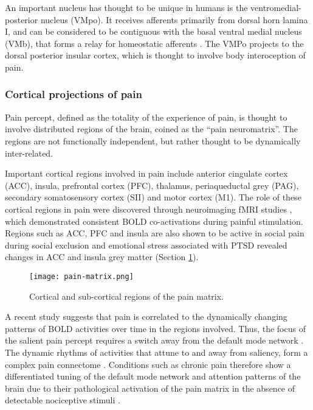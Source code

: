 An important nucleus has thought to be unique in humans is the ventromedial-posterior nucleus (VMpo)\cite{Willis2002,Craig2014}. It receives afferents primarily from dorsal horn lamina I, and can be considered to be contiguous with the basal ventral medial nucleus (VMb), that forms a relay for homeostatic afferents \cite{Craig2003}. The VMPo projects to the dorsal posterior insular cortex, which is thought to involve body interoception of pain.

\subsubsection{Cortical projections of pain}\label{section:neuromatrix}

Pain percept, defined as the totality of the experience of pain, is thought to involve distributed regions of the brain, coined as the “pain neuromatrix”\cite{Melzack1999a}. The regions are not functionally independent, but rather thought to be dynamically inter-related. 

 Important cortical regions involved in pain include anterior cingulate cortex (ACC), insula, prefrontal cortex (PFC), thalamus, periaqueductal grey (PAG), secondary somatosensory cortex (SII) and motor cortex (M1). The role of these cortical regions in pain were discovered through neuroimaging fMRI studies \cite{Apkarian2013c,Wager2013,Davis2012a}, which demonstrated consistent BOLD co-activations during painful stimulation.
Regions such as ACC, PFC and insula are also shown to be active in social pain during social exclusion and emotional stress associated with PTSD revealed changes in ACC and insula grey matter (Section \ref{fig:pain-matrix}).

 \begin{figure}[ht]
 \texttt{[image: pain-matrix.png]}
 \centering
 \caption{ Cortical and sub-cortical regions of the pain matrix. \protect\cite{Tracey2007a}} 
 \label{fig:pain-matrix}
 \end{figure}
 
A recent study suggests that pain is correlated to the dynamically changing patterns of BOLD activities over time in the regions involved. Thus, the focus of the salient pain percept requires a switch away from the default mode network \cite{Kucyi2013}. The dynamic rhythms of activities that attune to and away from saliency, form a complex pain connectome \cite{Kucyi2015}. Conditions such as chronic pain therefore show a differentiated tuning of the default mode network and attention patterns of the brain due to their pathological activation of the pain matrix in the absence of detectable nociceptive stimuli \cite{Baliki2008,Legrain2009}.

